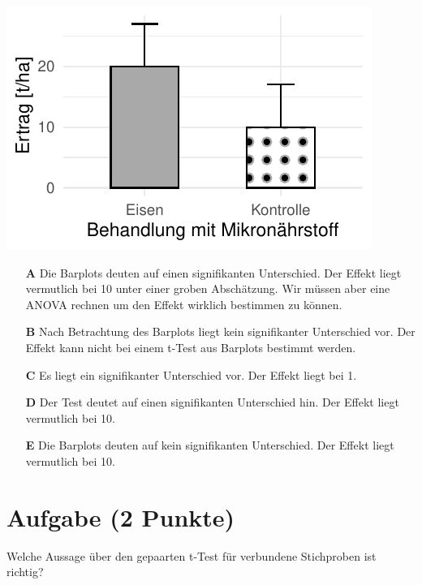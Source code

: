 \documentclass[a4paper, 9pt]{scrartcl}\usepackage[]{graphicx}\usepackage[]{xcolor}
\makeatletter
\def\maxwidth{ %
  \ifdim\Gin@nat@width>\linewidth
    \linewidth
  \else
    \Gin@nat@width
  \fi
}
\makeatother
\begin{document}
{\centering \includegraphics[width=\maxwidth]{img/mc-testing-ttest-02-1} 

}







\begin{enumerate}
\item [\textbf{A} \msquare] Die Barplots deuten auf einen signifikanten Unterschied. Der Effekt liegt vermutlich bei 10 unter einer groben Abschätzung. Wir müssen aber eine ANOVA rechnen um den Effekt wirklich bestimmen zu können.
\item [\textbf{B} \msquare] Nach Betrachtung des Barplots liegt kein signifikanter Unterschied vor. Der Effekt kann nicht bei einem t-Test aus Barplots bestimmt werden.
\item [\textbf{C} \msquare] Es liegt ein signifikanter Unterschied vor. Der Effekt liegt bei 1.
\item [\textbf{D} \msquare] Der Test deutet auf einen signifikanten Unterschied hin. Der Effekt liegt vermutlich bei 10.
\item [\textbf{E} \msquare] Die Barplots deuten auf kein signifikanten Unterschied. Der Effekt liegt vermutlich bei 10.
\end{enumerate}

\section{Aufgabe \hfill (2 Punkte)}




Welche Aussage über den gepaarten t-Test für verbundene Stichproben ist richtig?
\end{document}
